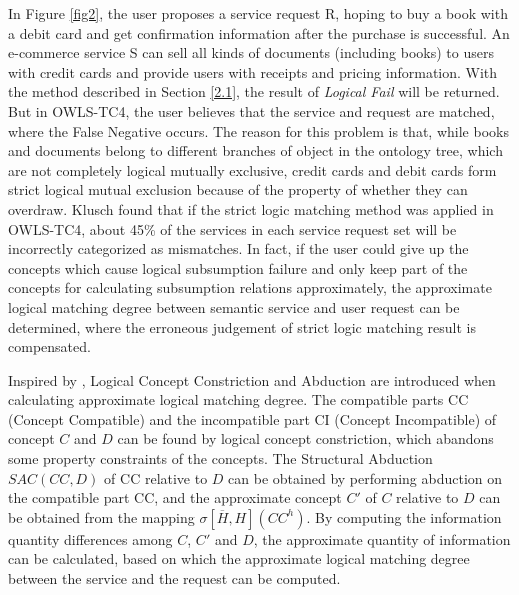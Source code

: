 \documentclass{ieeeaccess}
\begin{document}
In Figure \ref{fig2}, the user proposes a service request R, hoping to buy a book with a debit card and get confirmation information after the purchase is successful. An e-commerce service S can sell all kinds of documents (including books) to users with credit cards and provide users with receipts and pricing information. With the method described in Section \ref{2.1}, the result of \textit{Logical Fail} will be returned. But in OWLS-TC4, the user believes that the service and request are matched, where the False Negative occurs. The reason for this problem is that, while books and documents belong to different branches of object in the ontology tree, which are not completely logical mutually exclusive, credit cards and debit cards form strict logical mutual exclusion because of the property of whether they can overdraw. Klusch found that if the strict logic matching method was applied in OWLS-TC4, about 45\% of the services in each service request set will be incorrectly categorized as mismatches\cite{klusch2012isem}. In fact, if the user could give up the concepts which cause logical subsumption failure and only keep part of the concepts for calculating subsumption relations approximately, the approximate logical matching degree between semantic service and user request can be determined, where the erroneous judgement of strict logic matching result is compensated.

Inspired by \cite{di2009tableaux}, Logical Concept Constriction and Abduction are introduced when calculating approximate logical matching degree. The compatible parts CC (Concept Compatible) and the incompatible part CI (Concept Incompatible) of concept $C$ and $D$ can be found by logical concept constriction, which abandons some property constraints of the concepts. The Structural Abduction $SAC\left( CC,D \right)$ of CC relative to $D$ can be obtained by performing abduction on the compatible part CC, and the approximate concept $C'$ of $C$ relative to $D$ can be obtained from the mapping $\sigma \left[ \overline{H},H \right]\left( C{{C}^{h}} \right)$. By computing the information quantity differences among $C$, $C'$ and $D$, the approximate quantity of information can be calculated, based on which the approximate logical matching degree between the service and the request can be computed.
\end{document}

